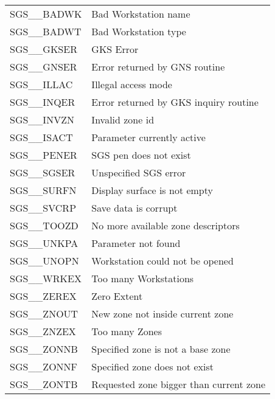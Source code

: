 \begin{tabular}{ll}
SGS\_\_BADWK     & Bad Workstation name \\
SGS\_\_BADWT     & Bad Workstation type \\
SGS\_\_GKSER     & GKS Error \\
SGS\_\_GNSER     & Error returned by GNS routine \\
SGS\_\_ILLAC     & Illegal access mode \\
SGS\_\_INQER     & Error returned by GKS inquiry routine \\
SGS\_\_INVZN     & Invalid zone id \\
SGS\_\_ISACT     & Parameter currently active \\
SGS\_\_PENER     & SGS pen does not exist \\
SGS\_\_SGSER     & Unspecified SGS error \\
SGS\_\_SURFN     & Display surface is not empty \\
SGS\_\_SVCRP     & Save data is corrupt \\
SGS\_\_TOOZD     & No more available zone descriptors \\
SGS\_\_UNKPA     & Parameter not found \\
SGS\_\_UNOPN     & Workstation could not be opened \\
SGS\_\_WRKEX     & Too many Workstations \\
SGS\_\_ZEREX     & Zero Extent \\
SGS\_\_ZNOUT     & New zone not inside current zone \\
SGS\_\_ZNZEX     & Too many Zones \\
SGS\_\_ZONNB     & Specified zone is not a base zone \\
SGS\_\_ZONNF     & Specified zone does not exist \\
SGS\_\_ZONTB     & Requested zone bigger than current zone 
\end{tabular}





\newpage
